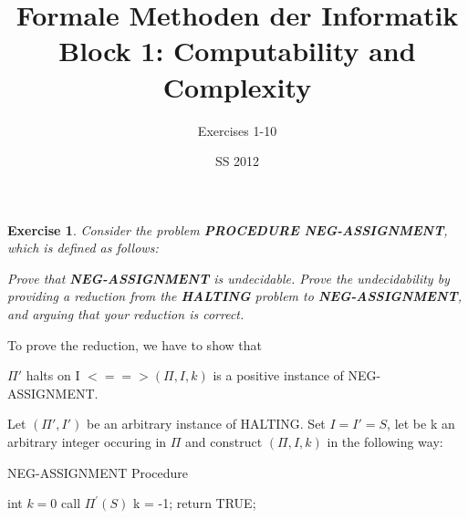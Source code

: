 \documentclass [11pt]{article}
\title{Formale Methoden der Informatik \\
Block 1: Computability and Complexity }
\author{Exercises 1-10}
\date{SS 2012}
\newtheorem{exercise}[theorem]{Exercise}
\newcommand{\solution}[1]{\noindent {\bf Solution.}  #1}
\begin{document}
\maketitle


\begin{exercise}
  Consider the problem \textbf{PROCEDURE NEG-ASSIGNMENT}, which is defined
  as follows:

  \begin{center}
  \end{center}
  Prove that \textbf{NEG-ASSIGNMENT} is undecidable. Prove the undecidability
  by providing a reduction from the \textbf{HALTING} problem to
  \textbf{NEG-ASSIGNMENT}, and arguing that your reduction is correct.
\end{exercise}


\solution

To prove the reduction, we have to show that 

\bigskip

$\Pi'$ halts on I $<==>(\Pi, I, k)$ is a positive instance of NEG-ASSIGNMENT.

\bigskip

Let $(\Pi', I') $ be an arbitrary instance of HALTING.  Set $I = I' = S $, let be k an arbitrary integer occuring in $\Pi$ and  construct $(\Pi, I, k) $ in the following way: 

\smallskip


\begin{algorithm}
\caption{NEG-ASSIGNMENT Procedure}
\label{<your label for references later in your document>}
\begin{algorithmic}

 \State int $k = 0$
 \State call $\Pi^\prime(S)$
 \State k = -1;
 \State return TRUE;
\EndFunction

\end{algorithmic}
\end{algorithm}
\end{document}
